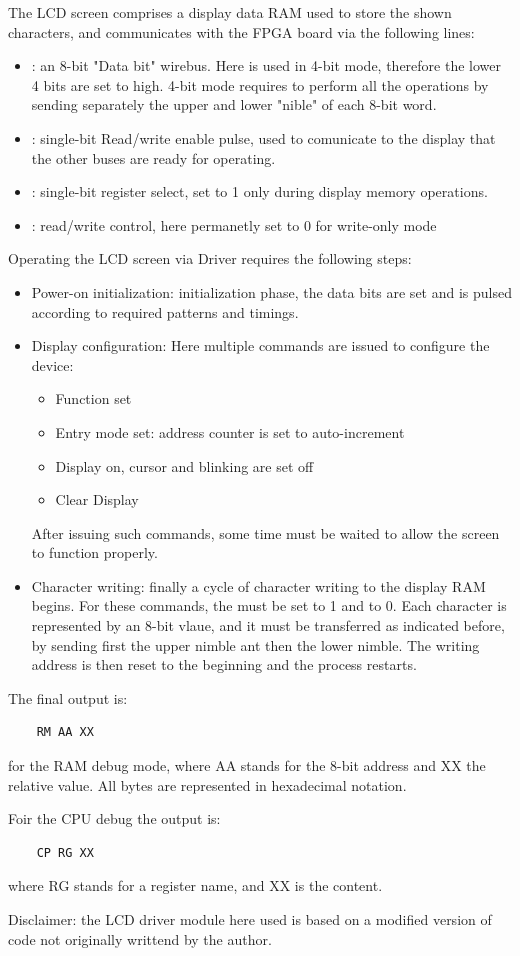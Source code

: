 The LCD screen comprises a display data RAM used to store the shown characters,
and communicates with the FPGA board via the following lines:
\begin{itemize}
    \item {}: an 8-bit "Data bit" wirebus. Here is used in 4-bit mode, therefore the lower 4 bits are set to high. 
    4-bit mode requires to perform all the operations by sending separately the upper and lower "nible" of each 8-bit word.
    \item {}: single-bit Read/write enable pulse, used to comunicate to the display that the other buses are ready for operating.
    \item {}: single-bit register select, set to 1 only during display memory operations.
    \item {}: read/write control, here permanetly set to 0 for write-only mode
\end{itemize}
Operating the LCD screen via Driver requires the following steps:
\begin{itemize}
    \item Power-on initialization: initialization phase, the data bits are set and  is pulsed according to required patterns and timings.
    \item Display configuration: Here multiple commands are issued to configure the device:
    \begin{itemize}
        \item Function set
        \item Entry mode set: address counter is set to auto-increment
        \item Display on, cursor and blinking are set off
        \item Clear Display
    \end{itemize}
    After issuing such commands, some time must be waited to allow the screen to function properly.
    \item Character writing: finally a cycle of character writing to the display RAM begins. For these commands, the  must be set
    to 1 and  to 0. Each character is represented by an 8-bit vlaue, and it must be transferred as indicated before, by sending first the upper nimble ant then the lower nimble.
    The writing address is then reset to the beginning and the process restarts.
\end{itemize}
The final output is:

\begin{verbatim}
    RM AA XX
\end{verbatim}
for the RAM debug mode, where AA stands for the 8-bit address and XX the relative value.
All bytes are represented in hexadecimal notation.

Foir the CPU debug the output is:
\begin{verbatim}
    CP RG XX
\end{verbatim}
where RG stands for a register name, and XX is the content.

Disclaimer: the LCD driver module here used is based on a modified version of code not originally writtend by the author.